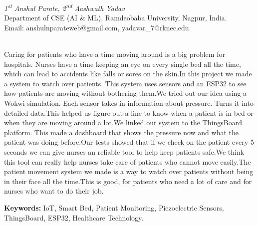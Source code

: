 \documentclass[12pt]{article}
\begin{document}
\vspace{1.5em}

\noindent\textit{1\textsuperscript{st} Anshul Parate, 2\textsuperscript{nd} Aashwath Yadav }\\[1em]
\noindent Department of CSE (AI \& ML), Ramdeobaba University, Nagpur, India.\\[1em]
\noindent Email: anshulnparateweb@gmail.com, yadavar\_7@rknec.edu
\vspace{1.5em}

\\[0.5em]
\noindent Caring for patients who have a time moving around is a big problem for hospitals. Nurses have a time keeping an eye on every single bed all the time, which can lead to accidents like falls or sores on the skin.In this project we made a system to watch over patients. This system uses sensors and an ESP32 to see how patients are moving without bothering them.We tried out our idea using a Wokwi simulation. Each sensor takes in information about pressure. Turns it into detailed data.This helped us figure out a line to know when a patient is in bed or when they are moving around a lot.We linked our system to the ThingsBoard platform. This made a dashboard that shows the pressure now and what the patient was doing before.Our tests showed that if we check on the patient every 5 seconds we can give nurses an reliable tool to help keep patients safe.We think this tool can really help nurses take care of patients who cannot move easily.The patient movement system we made is a way to watch over patients without being in their face all the time.This is good, for patients who need a lot of care and for nurses who want to do their job.\par
\vspace{1em}

\noindent\textbf{Keywords:} IoT, Smart Bed, Patient Monitoring, Piezoelectric Sensors, ThingsBoard, ESP32, Healthcare Technology.
\end{document}
